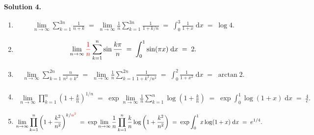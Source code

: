 \documentclass[10pt]{article}
\begin{document}
        \textbf{Solution 4.}
        \begin{enumerate}
                \item
                        \begin{align*}
                                \lim_{n \to \infty} \sum_{k = 1}^{3n} \frac{1}{n + k}
                                \;=\; \lim_{n \to \infty} \frac{1}{n}\sum_{k = 1}^{3n} \frac{1}{1 + k /n}
                                \;=\; \int_0^3 \frac{1}{1 + x} \;\mathrm{d}{x}
                                \;=\; \log{4}.
                        \end{align*}
                \item 
                        \begin{align*}
                                \lim_{n \to \infty} \textcolor{red}{\frac{1}{n}}\sum_{k = 1}^{n} \sin{\frac{k\pi}{n}}
                                \;=\; \int_0^1 \sin(\pi x) \;\mathrm{d}{x}
                                \;=\; 2.
                        \end{align*}
                \item 
                        \begin{align*}
                                \lim_{n \to \infty} \sum_{k = 1}^{2n} \frac{n}{n^2 + k^2}
                                \;=\; \lim_{n \to \infty} \frac{1}{n}\sum_{k = 1}^{2n} \frac{1}{1 + k^2 /n^2}
                                \;=\; \int_0^2 \frac{1}{1 + x^2} \;\mathrm{d}{x}
                                \;=\; \arctan{2}.
                        \end{align*}
                \item 
                        \begin{align*}
                                \lim_{n \to \infty} \prod_{k = 1}^{n} \left(1 + \frac{k}{n}\right)^{1 /n}
                                \;=\; \exp \lim_{n \to \infty} \frac{1}{n}\sum_{k = 1}^{n} \log\left(1 + \frac{k}{n} \right)
                                \;=\; \exp \int_0^1 \log(1 + x) \;\mathrm{d}{x}
                                \;=\; \frac{4}{e}.
                        \end{align*}
                \item 
                        \begin{align*}
                                \lim_{n \to \infty} \prod_{k = 1}^n \left(1 + \frac{k^2}{n^2}\right)^{k /\color{red}{n^2}}
                                \;=\; \exp \lim_{n \to \infty} \frac{1}{n} \prod_{k = 1}^n \frac{k}{n} \log\left(1 + \frac{k^2}{n^2}\right)
                                \;=\; \exp \int_0^1 x \log(1 + x) \;\mathrm{d}x
                                \;=\; e^{1 /4}.
                        \end{align*}
        \end{enumerate}
        
\end{document}
